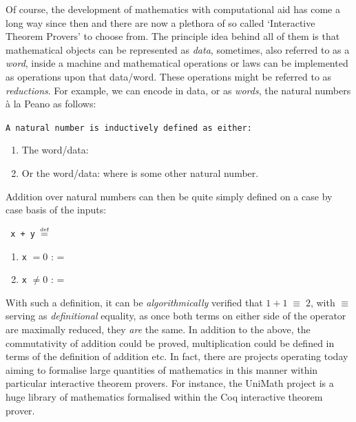 \documentclass[oneside,12pt]{article}
\newcommand{\eqdef}{$\stackrel{\text{\tiny def}}{=}$}
\begin{document}
Of course, the development of mathematics with computational aid has come a long way since then and there are now a plethora of so called `Interactive Theorem Provers' to choose from. The principle idea behind all of them is that mathematical objects can be represented as \emph{data}, sometimes, also referred to as a \emph{word}, inside a machine and mathematical operations or laws can be implemented as operations upon that data/word. These operations might be referred to as \emph{reductions}. For example, we can encode in data, or as \emph{words}, the natural numbers \`{a} la Peano as follows:

\vspace{0.3em}

\texttt{A natural number is inductively defined as either:}

\begin{enumerate}
\item  The word/data: 
\item  Or the word/data:  where  is some other natural number.
\end{enumerate}



Addition over natural numbers can then be quite simply defined on a case by case basis of the inputs:


\begin{center}
  \begin{minipage}{.75\textwidth}
    \texttt{ x + y  \; \eqdef \,}
    \begin{varwidth}{\textwidth}
    \begin{enumerate}
    \item  \texttt{x} $= 0$ : \;\;\;\;\;  =  
    \item  \texttt{x} $\neq 0$ : \;\;\;\;\;   =  
    \end{enumerate}
    \end{varwidth}
  \end{minipage}
\end{center}

With such a definition, it can be \emph{algorithmically} verified that $ 1  +  1 \; \equiv \; 2$, with $\equiv$ serving as \emph{definitional} equality, as once both terms on either side of the operator are maximally reduced, they \emph{are} the same. In addition to the above, the commutativity of addition could be proved, multiplication could be defined in terms of the definition of addition etc. In fact, there are projects operating today aiming to formalise large quantities of mathematics in this manner within particular interactive theorem provers. For instance, the UniMath project is a huge library of mathematics formalised within the Coq interactive theorem prover.
\end{document}
